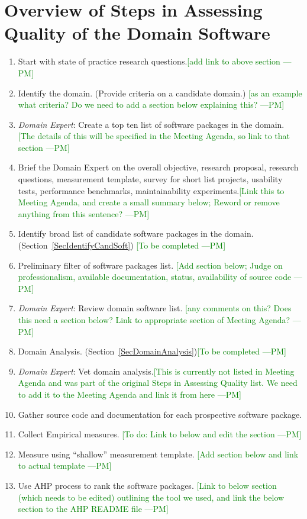 \documentclass[letterpaper,cleveref]{lipics-v2019}
\newcommand{\authornote}[3]{\textcolor{#1}{[#3 ---#2]}}
\newcommand{\authornote}[3]{}
\newcommand{\pmi}[1]{\authornote{green}{PM}{#1}} %
\theoremstyle{definition}
\begin{document}
\section{Overview of Steps in Assessing Quality of the Domain Software}

\begin{enumerate}
\item Start with state of practice research questions.\pmi{add link to above section}
\item Identify the domain.  (Provide criteria on a candidate domain.) \pmi{as an example what criteria? Do we need to add a section below explaining this?}
\item \emph{Domain Expert}: Create a top ten list of software packages in the domain. \pmi{The details of this will be specified in the Meeting Agenda, so link to that section}
\item Brief the Domain Expert on the overall objective, research proposal, research questions, measurement template, survey for short list projects, usability tests, performance benchmarks, maintainability experiments.\pmi{Link this to Meeting Agenda, and create a small summary below; Reword or remove anything from this sentence?}
\item Identify broad list of candidate software packages in the domain. (Section~\ref{SecIdentifyCandSoft}) \pmi{To be completed}
\item Preliminary filter of software packages list. \pmi{Add section below; Judge on professionalism, available documentation, status, availability of source code}
\item \emph{Domain Expert}: Review domain software list. \pmi{any comments on this? Does this need a section below? Link to appropriate section of Meeting Agenda?}
\item Domain Analysis. (Section~\ref{SecDomainAnalysis})\pmi{To be completed}
\item \emph{Domain Expert}: Vet domain analysis.\pmi{This is currently not listed in Meeting Agenda and was part of the original Steps in Assessing Quality list. We need to add it to the Meeting Agenda and link it from here}
\item Gather source code and documentation for each prospective software package.
\item Collect Empirical measures. \pmi{To do: Link to below and edit the section}
\item Measure using ``shallow'' measurement template. \pmi{Add section below and link to actual template}
\item Use AHP process to rank the software packages. \pmi{Link to below section (which needs to be edited) outlining the tool we used, and link the below section to the AHP README file}

\end{enumerate}
\end{document}
